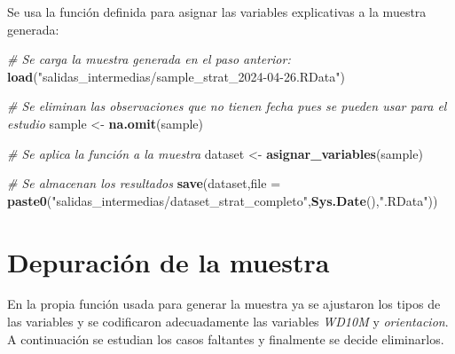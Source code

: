 \documentclass[12pt,a4paper,]{book}
\newenvironment{Shaded}{\begin{snugshade}}{\end{snugshade}}
\newcommand{\AttributeTok}[1]{\textcolor[rgb]{0.13,0.29,0.53}{#1}}
\newcommand{\CommentTok}[1]{\textcolor[rgb]{0.56,0.35,0.01}{\textit{#1}}}
\newcommand{\FunctionTok}[1]{\textcolor[rgb]{0.13,0.29,0.53}{\textbf{#1}}}
\newcommand{\NormalTok}[1]{#1}
\newcommand{\OtherTok}[1]{\textcolor[rgb]{0.56,0.35,0.01}{#1}}
\newcommand{\StringTok}[1]{\textcolor[rgb]{0.31,0.60,0.02}{#1}}
\numberwithin{dummy}{section}
\theoremstyle{ocrenumbox}
\theoremstyle{blacknumex}
\theoremstyle{blacknumbox}
\theoremstyle{ocrenum}
\theoremstyle{ocrenum}
\begin{document}
Se usa la función definida para asignar las variables explicativas a la
muestra generada:

\begin{Shaded}
\begin{Highlighting}[]
\CommentTok{\# Se carga la muestra generada en el paso anterior:}
\FunctionTok{load}\NormalTok{(}\StringTok{"salidas\_intermedias/sample\_strat\_2024{-}04{-}26.RData"}\NormalTok{)}

\CommentTok{\# Se eliminan las observaciones que no tienen fecha pues se pueden usar para el estudio}
\NormalTok{sample }\OtherTok{\textless{}{-}} \FunctionTok{na.omit}\NormalTok{(sample)}

\CommentTok{\# Se aplica la función a la muestra }
\NormalTok{dataset }\OtherTok{\textless{}{-}} \FunctionTok{asignar\_variables}\NormalTok{(sample)}

\CommentTok{\# Se almacenan los resultados}
\FunctionTok{save}\NormalTok{(dataset,}\AttributeTok{file =} \FunctionTok{paste0}\NormalTok{(}\StringTok{"salidas\_intermedias/dataset\_strat\_completo"}\NormalTok{,}\FunctionTok{Sys.Date}\NormalTok{(),}\StringTok{".RData"}\NormalTok{))}
\end{Highlighting}
\end{Shaded}

\hypertarget{depuraciuxf3n-de-la-muestra}{%
\section{Depuración de la muestra}\label{depuraciuxf3n-de-la-muestra}}

En la propia función usada para generar la muestra ya se ajustaron los
tipos de las variables y se codificaron adecuadamente las variables
\emph{WD10M} y \emph{orientacion}. A continuación se estudian los casos
faltantes y finalmente se decide eliminarlos.
\end{document}
